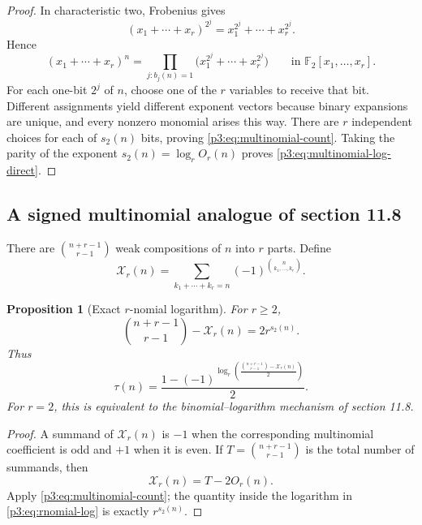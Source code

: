 \documentclass[11pt,oneside]{article}
\newtheorem{proposition}[theorem]{Proposition}
\theoremstyle{definition}
\theoremstyle{remark}
\newcommand{\F}{\mathbb F}
\newcommand{\swt}{s_2}
\newcommand{\1}{\mathbf 1}
\begin{document}
\begin{proof}
In characteristic two, Frobenius gives
\[
 (x_1+\cdots+x_r)^{2^j}=x_1^{2^j}+\cdots+x_r^{2^j}.
\]
Hence
\begin{equation}
 (x_1+\cdots+x_r)^n
 =\prod_{j:b_j(n)=1}
   \bigl(x_1^{2^j}+\cdots+x_r^{2^j}\bigr)
 \qquad\text{in }\F_2[x_1,\ldots,x_r].
 \label{p3:eq:multinomial-frob-factor}
\end{equation}
For each one-bit \(2^j\) of \(n\), choose one of the \(r\) variables to receive that bit.
Different assignments yield different exponent vectors because binary expansions are unique,
and every nonzero monomial arises this way.  There are \(r\) independent choices for each of
\(\swt(n)\) bits, proving \eqref{p3:eq:multinomial-count}.  Taking the parity of the exponent
\(\swt(n)=\log_rO_r(n)\) proves \eqref{p3:eq:multinomial-log-direct}.
\end{proof}

\subsection{A signed multinomial analogue of section 11.8}

There are \(\binom{n+r-1}{r-1}\) weak compositions of \(n\) into \(r\) parts.  Define
\begin{equation}
 \mathcal X_r(n)=
 \sum_{k_1+\cdots+k_r=n}
 (-1)^{\binom{n}{k_1,\ldots,k_r}}.
 \label{p3:eq:Xr}
\end{equation}

\begin{proposition}[Exact \(r\)-nomial logarithm]
\label{p3:prop:rnomial-exact}
For \(r\ge2\),
\begin{equation}
 \binom{n+r-1}{r-1}-\mathcal X_r(n)
 =2r^{\swt(n)}.
 \label{p3:eq:rnomial-exact}
\end{equation}
Thus
\begin{equation}
 \boxed{
 \tau(n)=
 \frac{1-(-1)^{\displaystyle
  \log_r\!\left(\frac{\binom{n+r-1}{r-1}-\mathcal X_r(n)}2\right)}}2.}
 \label{p3:eq:rnomial-log}
\end{equation}
For \(r=2\), this is equivalent to the binomial--logarithm mechanism of section 11.8.
\end{proposition}

\begin{proof}
A summand of \(\mathcal X_r(n)\) is \(-1\) when the corresponding multinomial coefficient is
odd and \(+1\) when it is even.  If \(T=\binom{n+r-1}{r-1}\) is the total number of summands,
then
\[
 \mathcal X_r(n)=T-2O_r(n).
\]
Apply \eqref{p3:eq:multinomial-count}; the quantity inside the logarithm in
\eqref{p3:eq:rnomial-log} is exactly \(r^{\swt(n)}\).
\end{proof}
\end{document}
